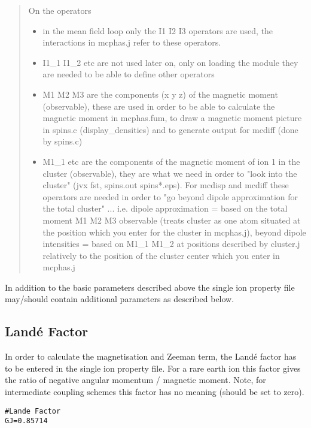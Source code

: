 \begin{quote}
On the operators
\begin{itemize}
\item in the mean field loop only the I1 I2 I3  operators are used, the interactions in mcphas.j refer to these operators. 
\item I1\_1 I1\_2 etc are not used later on, only on loading the module they are needed to be 
      able to define other operators
\item M1 M2 M3 are the components (x y z) of the magnetic moment (observable), these are 
      used in order to be able to calculate the magnetic moment in {\prg mcphas.fum}, to draw a
      magnetic moment picture in {\prg spins.c} ({\prg display\_densities}) and to generate output for 
      mcdiff (done by spins.c)
\item M1\_1 etc are the components of the magnetic moment of ion 1 in the cluster 
      (observable), they are what we need in order to "look into the cluster"
      ({\prg jvx fst, spins.out spins*.eps}). For {\prg mcdisp} and {\prg mcdiff} these operators are needed
      in order to "go beyond dipole approximation for the total cluster" ... i.e. dipole 
      approximation = based on the total moment M1 M2 M3 observable (treats cluster as 
      one atom situated at the position which you enter for the cluster in mcphas.j),
       beyond dipole intensities = based on M1\_1 M1\_2 at positions described by cluster.j 
      relatively to the position of the cluster center which you enter in mcphas.j
\end{itemize}

\end{quote}

In addition to the basic parameters described above the single ion property file 
may/should contain additional parameters as described below. 

\subsection{Land\'e Factor}

In order to calculate the magnetisation and Zeeman term, the Land\'e factor
has to be entered in the single ion property file. For a rare earth ion this
factor gives the ratio of negative angular momentum / magnetic moment.
Note, for intermediate coupling schemes this factor has no meaning (should be set to zero).

\begin{verbatim}
#Lande Factor
GJ=0.85714
\end{verbatim}


